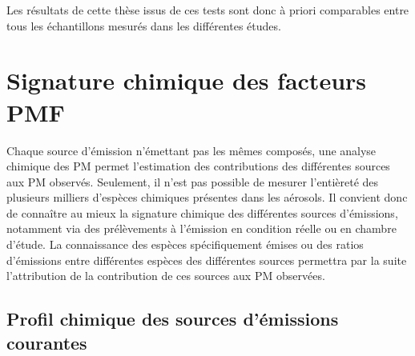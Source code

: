 Les résultats de cette thèse issus de ces tests sont donc à priori comparables entre tous les
échantillons mesurés dans les différentes études.


\section{Signature chimique des facteurs PMF}%
\label{sec:signature_chimique_des_facteurs_PMF}

Chaque source d'émission n'émettant pas les mêmes composés, une analyse chimique
des PM permet l'estimation des contributions des différentes sources aux PM observés.
Seulement, il n'est pas possible de mesurer l'entièreté des plusieurs milliers d'espèces chimiques
présentes dans les aérosols.
Il convient donc de connaître au mieux la signature chimique des différentes sources
d'émissions, notamment via des prélèvements à l'émission en condition
réelle ou en chambre d'étude. La connaissance des espèces spécifiquement émises ou des
ratios d'émissions entre différentes espèces des différentes sources permettra par la
suite l'attribution de la contribution de ces sources aux PM observées.

\subsection{Profil chimique des sources d'émissions courantes}%
\label{sub:profil_chimique_des_sources_d_émissions_courantes}

